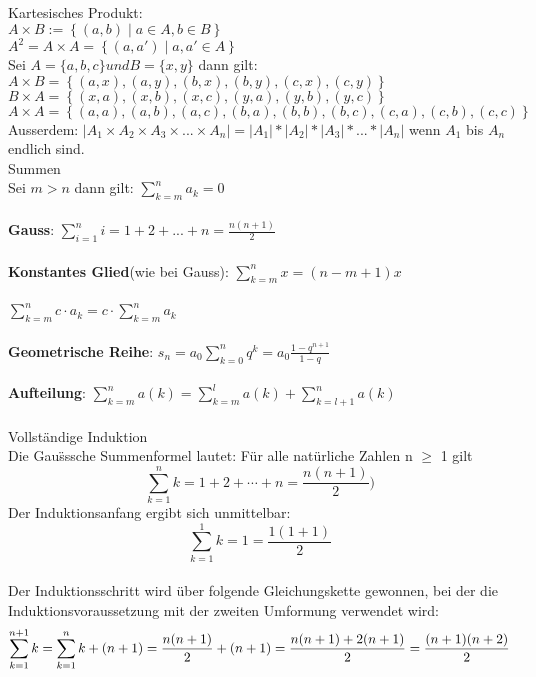 \documentclass[11pt]{article}
\begin{document}
Kartesisches Produkt:\\
$A \times B := \left\{ (a, b) \mid a \in A, b \in B \right\}$ \\
$A^2 = A \times A = \left\{ (a, a') \mid a, a' \in A \right\}$ \\
Sei $A=\{ a, b, c \} und B=\{ x, y \}$ dann gilt: \\
$A \times B = \left\{ (a,x), (a,y), (b,x), (b,y), (c,x), (c,y) \right\}$ \\
$B \times A = \left\{ (x,a), (x,b), (x,c), (y,a), (y,b), (y,c) \right\}$ \\
$A \times A = \left\{ (a,a), (a,b), (a,c), (b,a), (b,b), (b,c), (c,a), (c,b), (c,c) \right\}$\\
Ausserdem: $\mathopen| A_1 \times A_2 \times A_3 \times ... \times A_n \mathclose| = \mathopen|A_1\mathclose|*\mathopen|A_2\mathclose|*\mathopen|A_3\mathclose|*...*\mathopen|A_n\mathclose|$ wenn $A_1$ bis $A_n$ endlich sind.\\


Summen\\
Sei $m>n$ dann gilt: $\sum_{k=m}^{n}a_k = 0$\\ \\
{\bfseries Gauss}: $\sum_{i=1}^n{i} = 1+2+...+n = \frac{n(n+1)}{2}$ \\ \\
{\bfseries Konstantes Glied}(wie bei Gauss): $\sum_{k=m}^{n}x = (n-m+1)x$ \\ \\
$\sum_{k=m}^{n}c\cdot a_k = c\cdot \sum_{k=m}^{n}a_k$ \\ \\
{\bfseries Geometrische Reihe}: $s_n=a_0\sum_{k=0}^{n} q^k = a_0\frac{1-q^{n+1}}{1-q}$ \\ \\
{\bfseries Aufteilung}: $\sum_{k=m}^n a(k) = \sum_{k=m}^l a(k) + \sum_{k=l+1}^n a(k)$ \\ \\

Vollst{\"a}ndige Induktion\\
Die Gau{\"ss}sche Summenformel lautet: F{\"u}r alle nat{\"u}rliche Zahlen n $\geq$ 1 gilt
$$\sum^n_{k=1} k = 1+2+\cdots+n = \frac{n(n+1)}{2})$$
Der Induktionsanfang ergibt sich unmittelbar: $$\sum^1_{k=1} k = 1 = \frac{1(1+1)}{2}$$ \\
Der Induktionsschritt wird {\"u}ber folgende Gleichungskette gewonnen, bei der die Induktionsvoraussetzung mit der zweiten Umformung verwendet wird: $$\sum^{n+1}_{k=1} k = \sum^n_{k=1} k + (n+1) = \frac{n(n+1)}{2}+(n+1)\\ =\frac{n(n+1)+2(n+1)}{2} = \frac{(n+1)(n+2)}{2}$$ \\ \\
\end{document}
